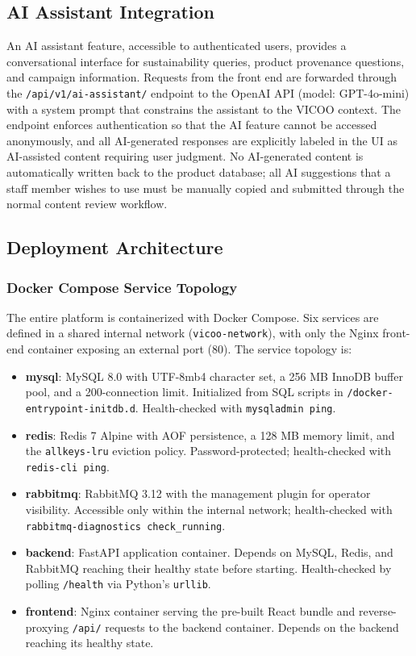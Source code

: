 \documentclass[11pt]{article}
\begin{document}
\subsection{AI Assistant Integration}
An AI assistant feature, accessible to authenticated users, provides a conversational interface for sustainability queries, product provenance questions, and campaign information. Requests from the front end are forwarded through the \texttt{/api/v1/ai-assistant/} endpoint to the OpenAI API (model: GPT-4o-mini) with a system prompt that constrains the assistant to the VICOO context. The endpoint enforces authentication so that the AI feature cannot be accessed anonymously, and all AI-generated responses are explicitly labeled in the UI as AI-assisted content requiring user judgment. No AI-generated content is automatically written back to the product database; all AI suggestions that a staff member wishes to use must be manually copied and submitted through the normal content review workflow.

\subsection{Deployment Architecture}
\subsubsection{Docker Compose Service Topology}
The entire platform is containerized with Docker Compose. Six services are defined in a shared internal network (\texttt{vicoo-network}), with only the Nginx front-end container exposing an external port (80). The service topology is:

\begin{itemize}[leftmargin=2.2em]
    \item \textbf{mysql}: MySQL 8.0 with UTF-8mb4 character set, a 256 MB InnoDB buffer pool, and a 200-connection limit. Initialized from SQL scripts in \texttt{/docker-entrypoint-initdb.d}. Health-checked with \texttt{mysqladmin ping}.
    \item \textbf{redis}: Redis 7 Alpine with AOF persistence, a 128 MB memory limit, and the \texttt{allkeys-lru} eviction policy. Password-protected; health-checked with \texttt{redis-cli ping}.
    \item \textbf{rabbitmq}: RabbitMQ 3.12 with the management plugin for operator visibility. Accessible only within the internal network; health-checked with \texttt{rabbitmq-diagnostics check\_running}.
    \item \textbf{backend}: FastAPI application container. Depends on MySQL, Redis, and RabbitMQ reaching their healthy state before starting. Health-checked by polling \texttt{/health} via Python's \texttt{urllib}.
    \item \textbf{frontend}: Nginx container serving the pre-built React bundle and reverse-proxying \texttt{/api/} requests to the backend container. Depends on the backend reaching its healthy state.
\end{itemize}
\end{document}
